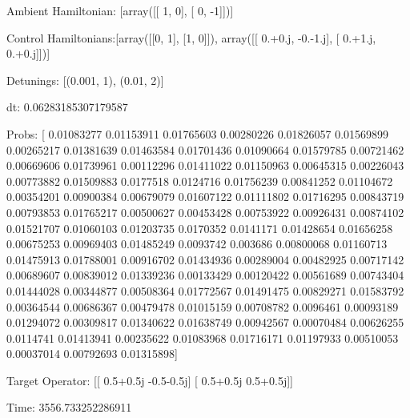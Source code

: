 \documentclass{article}
\begin{document}
    

\newpage

Ambient Hamiltonian: [array([[ 1,  0],
       [ 0, -1]])]

Control Hamiltonians:[array([[0, 1],
       [1, 0]]), array([[ 0.+0.j, -0.-1.j],
       [ 0.+1.j,  0.+0.j]])]

Detunings: [(0.001, 1), (0.01, 2)]

 dt: 0.06283185307179587

Probs: [ 0.01083277  0.01153911  0.01765603  0.00280226  0.01826057  0.01569899
  0.00265217  0.01381639  0.01463584  0.01701436  0.01090664  0.01579785
  0.00721462  0.00669606  0.01739961  0.00112296  0.01411022  0.01150963
  0.00645315  0.00226043  0.00773882  0.01509883  0.0177518   0.0124716
  0.01756239  0.00841252  0.01104672  0.00354201  0.00900384  0.00679079
  0.01607122  0.01111802  0.01716295  0.00843719  0.00793853  0.01765217
  0.00500627  0.00453428  0.00753922  0.00926431  0.00874102  0.01521707
  0.01060103  0.01203735  0.0170352   0.0141171   0.01428654  0.01656258
  0.00675253  0.00969403  0.01485249  0.0093742   0.003686    0.00800068
  0.01160713  0.01475913  0.01788001  0.00916702  0.01434936  0.00289004
  0.00482925  0.00717142  0.00689607  0.00839012  0.01339236  0.00133429
  0.00120422  0.00561689  0.00743404  0.01444028  0.00344877  0.00508364
  0.01772567  0.01491475  0.00829271  0.01583792  0.00364544  0.00686367
  0.00479478  0.01015159  0.00708782  0.0096461   0.00093189  0.01294072
  0.00309817  0.01340622  0.01638749  0.00942567  0.00070484  0.00626255
  0.0114741   0.01413941  0.00235622  0.01083968  0.01716171  0.01197933
  0.00510053  0.00037014  0.00792693  0.01315898]

Target Operator: [[ 0.5+0.5j -0.5-0.5j]
 [ 0.5+0.5j  0.5+0.5j]]

Time: 3556.733252286911
\end{document}

